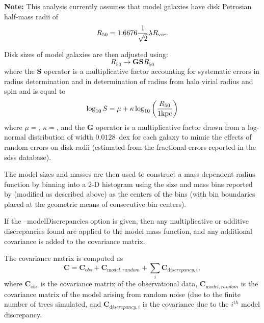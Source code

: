{\normalfont \bfseries Note:} This analysis currently assumes that model galaxies have disk Petrosian half-mass radii of
\begin{equation}
 R_{\mathrm 50} = 1.6676 {1 \over \sqrt{2}} \lambda R_{\mathrm vir}.
\end{equation}

Disk sizes of model galaxies are then adjusted using:
\begin{equation}
 R_{50} \rightarrow {\mathbf G} {\mathbf S} R_{50} 
\end{equation}
where the ${\mathbf S}$ operator is a multiplicative factor accounting for systematic errors in radius determination and in determination of radius from halo virial radius and spin and is equal to
\begin{equation}
 \log_{\mathrm 10} S = \mu + \kappa \log_{\mathrm 10} \left({R_{50} \over 1 \hbox{kpc}}\right)
\end{equation}
where $\mu=${\normalfont {}}, $\kappa=${\normalfont {}}, and the {\normalfont \bfseries G} operator is a multiplicative factor drawn from a log-normal distribution of width $0.0128$~dex for each galaxy to mimic the effects of random errors on disk radii (estimated from the fractional errors reported in the \gls{sdss} database).

The model sizes and masses are then used to construct a mass-dependent radius function by binning into a 2-D histogram using the size and mass bins reported by \cite{shen_size_2003} (modified as described above) as the centers of the bins (with bin boundaries placed at the geometric means of consecutive bin centers).

If the {\normalfont \ttfamily --modelDiscrepancies} option is given, then any multiplicative or additive discrepancies found are applied to the model mass function, and any additional covariance is added to the covariance matrix.

The covariance matrix is computed as
\begin{equation}
 {\mathbf C} = {\mathbf C}_{\mathrm obs} + {\mathbf C}_{\mathrm model,random} + \sum_i {\mathbf C}_{{\mathrm discrepancy}, i},
\end{equation}
where ${\mathbf C}_{\mathrm obs}$ is the covariance matrix of the observational data, ${\mathbf C}_{\mathrm model,random}$ is the covariance matrix of the model arising from random noise (due to the finite number of trees simulated, and ${\mathbf C}_{{\mathrm discrepancy}, i}$ is the covariance due to the $i^{\mathrm th}$ model discrepancy.

